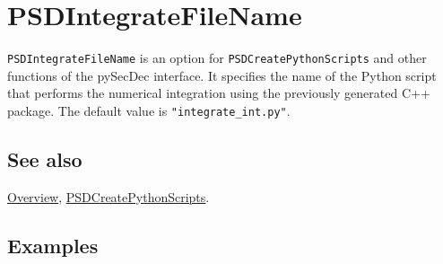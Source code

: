 \documentclass[../FeynHelpersManual.tex]{subfiles}
\begin{document}
\hypertarget{psdintegratefilename}{
\section{PSDIntegrateFileName}\label{psdintegratefilename}}

\texttt{PSDIntegrateFileName} is an option for
\texttt{PSDCreatePythonScripts} and other functions of the pySecDec
interface. It specifies the name of the Python script that performs the
numerical integration using the previously generated C++ package. The
default value is \texttt{"integrate_int.py"}.

\subsection{See also}

\hyperlink{toc}{Overview},
\hyperlink{psdcreatepythonscripts}{PSDCreatePythonScripts}.

\subsection{Examples}
\end{document}

